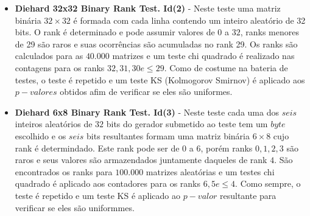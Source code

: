 \begin{itemize}
   \item \textbf{Diehard 32x32 Binary Rank Test. Id(2)} - Neste teste uma matriz binária $32\times32$ é formada com cada linha contendo um inteiro aleatório de 32 bits. O rank é determinado e pode assumir valores de $0$ a $32$, ranks menores de 29 são raros e suas ocorrências são acumuladas no rank 29. Os ranks são calculados para as $40.000$ matrizes e um teste chi quadrado é realizado nas contagens para os ranks $32, 31, 30 e \leqslant 29$. Como de costume na bateria de testes, o teste é repetido e um teste KS (Kolmogorov Smirnov) é aplicado aos $p-valores$ obtidos afim de verificar se eles são uniformes.

   \item \textbf{Diehard 6x8 Binary Rank Test. Id(3)} - Neste teste cada uma dos $seis$ inteiros aleatórios de $32$ bits do gerador submetido ao teste tem um $byte$ escolhido e os $seis$ bits resultantes formam uma matriz binária $6\times8$ cujo rank é determindado. Este rank pode ser de $0$ a $6$, porém ranks $0, 1, 2, 3$ são raros e seus valores são armazendados juntamente daqueles de rank $4$. São encontrados os ranks para $100.000$ matrizes aleatórias e um testes chi quadrado é aplicado aos contadores para os ranks $6, 5 e \leqslant4$. Como sempre, o teste é repetido e um teste KS é aplicado ao $p-valor$ resultante para verificar se eles são uniformmes.
   

\end{itemize}

